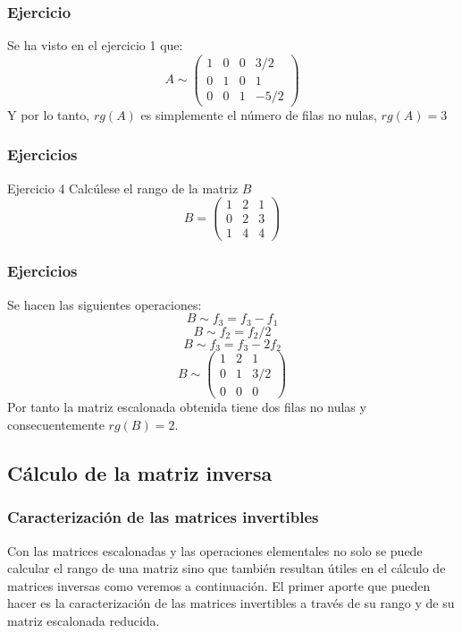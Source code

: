\documentclass[aspectratio=169]{beamer}
\begin{document}
       \begin{frame}
  \frametitle{Ejercicio}
Se ha visto en el ejercicio 1 que:
  \[A\sim \left(\begin{array}{cccc}1 & 0 & 0 & 3/2 \\0 & 1 & 0 & 1 \\0 & 0 & 1 & -5/2\end{array}\right)\]
  Y por lo tanto, $rg(A)$ es simplemente el n\'umero de filas no nulas, $rg(A)=3$
  \end{frame} 
  
     \begin{frame}
  \frametitle{Ejercicios}
   \begin{block}{Ejercicio 4}
Calc\'ulese el rango de la matriz $B$
\[B= \left(\begin{array}{ccc}1 & 2 & 1 \\0 & 2 & 3 \\1 & 4 & 4\end{array}\right)\]
\end{block}
  \end{frame} 


     \begin{frame}
  \frametitle{Ejercicios}
Se hacen las siguientes operaciones:
\[B\sim f_3 = f_3-f_1\]
\[B\sim f_2 = f_2/2\]
\[B\sim f_3 = f_3-2f_2\]
\[B\sim \left(\begin{array}{ccc}1 & 2 & 1 \\0 & 1 & 3/2 \\0 & 0 & 0\end{array}\right)\]
Por tanto la matriz escalonada obtenida tiene dos filas no nulas y consecuentemente $rg(B)=2$.
  \end{frame} 
  
  
  
  \subsection{C\'alculo de la matriz inversa}
       \begin{frame}
  \frametitle{Caracterizaci\'on de las matrices invertibles}
Con las matrices escalonadas y las operaciones elementales no solo se puede calcular el rango de una matriz sino que tambi\'en resultan \'utiles en el c\'alculo de matrices inversas como veremos a continuaci\'on. El primer aporte que pueden hacer es la caracterizaci\'on de las matrices invertibles a trav\'es de su rango y de su matriz escalonada reducida.
  \end{frame} 
  
\end{document}
